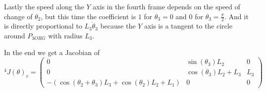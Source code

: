 \documentclass[10pt,a4paper]{article}
\begin{document}
Lastly the speed along the $Y$ axis in the fourth frame depends on the speed of change of $\theta_{2}$, but this time the coefficient is $1$ for $\theta_{3} = 0$ and $0$ for $\theta_{3} = \frac{\pi}{2}$.
And it is directly proportional to $L_{3} \dot{\theta}_{3}$ because the $Y$ axis is a tangent to the circle around $P_{3ORG}$ with radius $L_{3}$.

In the end we get a Jacobian of
\begin{equation*}
  {}^{4}J(\theta)_{v} = \begin{pmatrix}
    0 & \sin(\theta_{3})L_{2} & 0\\
    0 & \cos(\theta_{3})L_{2} + L_{3} & L_{3}\\
    -\left( \cos(\theta_{2} + \theta_{3}) L_{3} + \cos(\theta_{2})L_{2} + L_{1} \right) & 0 & 0
  \end{pmatrix}
\end{equation*}
\end{document}
